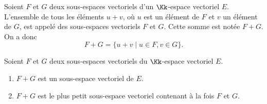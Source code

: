 \documentclass[class=report,crop=false]{standalone}
\begin{document}
\begin{definition}
Soient $F$ et $G$ deux sous-espaces vectoriels d'un $\Kk$-espace vectoriel $E$.
L'ensemble de tous les éléments $u+v$, où $u$ est un élément de
$F$ et $v$ un élément de $G$, est appelé  des sous-espaces vectoriels
$F$ et $G$. Cette somme est notée  $F+G$. On a donc
$$F+G=\big\{u+v \mid u \in F, v \in G \big\}.$$
\end{definition}


\begin{proposition}
Soient $F$ et $G$ deux sous-espaces vectoriels du $\Kk$-espace vectoriel $E$.
\begin{enumerate}
  \item $F+G$ est un sous-espace vectoriel de $E$.
  \item $F+G$ est le plus petit sous-espace vectoriel contenant à la fois $F$ et $G$.
\end{enumerate}


\end{proposition}
\end{document}
